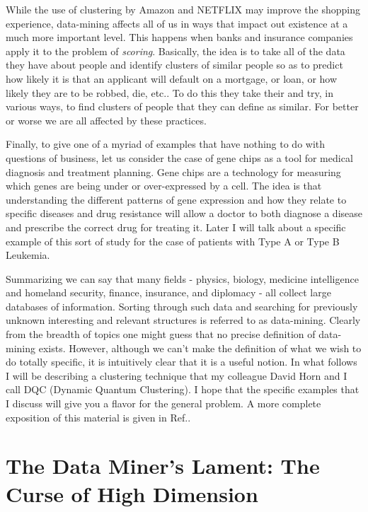 \documentclass[fleqn,twoside]{article}
\begin{document}
While the use of clustering by Amazon and NETFLIX may improve the
shopping experience, data-mining affects all of us in ways that
impact out existence at a much more important level.  This happens
when banks and insurance companies apply it to the problem of {\it
scoring\/}. Basically, the idea is to take all of the data they have
about people and identify clusters of similar people so as to
predict how likely it is that an applicant will default on a
mortgage, or loan, or how likely they are to be robbed, die, etc..
To do this they take their and try, in various
ways, to find clusters of people that they can define as similar.
For better or worse we are all affected by these practices.

Finally, to give one of a myriad of examples that have nothing to do
with questions of business, let us consider the case of gene chips as
a tool for medical diagnosis and treatment planning.  Gene chips are
a technology for measuring which genes are being under or
over-expressed by a cell.  The idea is that understanding
the different patterns of gene expression and how they relate to
specific diseases and drug resistance will allow a doctor to both
diagnose a disease and prescribe the correct drug for treating it.
Later I will talk about a specific example of this sort of study
for the case of patients with Type A or Type B Leukemia.

Summarizing we can say that many fields - physics, biology, medicine
intelligence and homeland security, finance, insurance, and diplomacy -
all collect large databases of information.  Sorting through such data
and searching for previously unknown interesting and relevant structures
is referred to as data-mining.  Clearly from the breadth of
topics one might guess that no precise definition of data-mining exists.
However, although we can't make the definition of what we wish to do
totally specific, it is intuitively clear that it is a useful notion.
In what follows I will be describing a clustering technique that my
colleague David Horn and I call DQC (Dynamic Quantum Clustering).
I hope that the specific examples that I discuss will give you a
flavor for the general problem.  A more complete exposition of this
material is given in Ref.\cite{MandH}.

\section{The Data Miner's Lament: The Curse of High Dimension}
\end{document}
